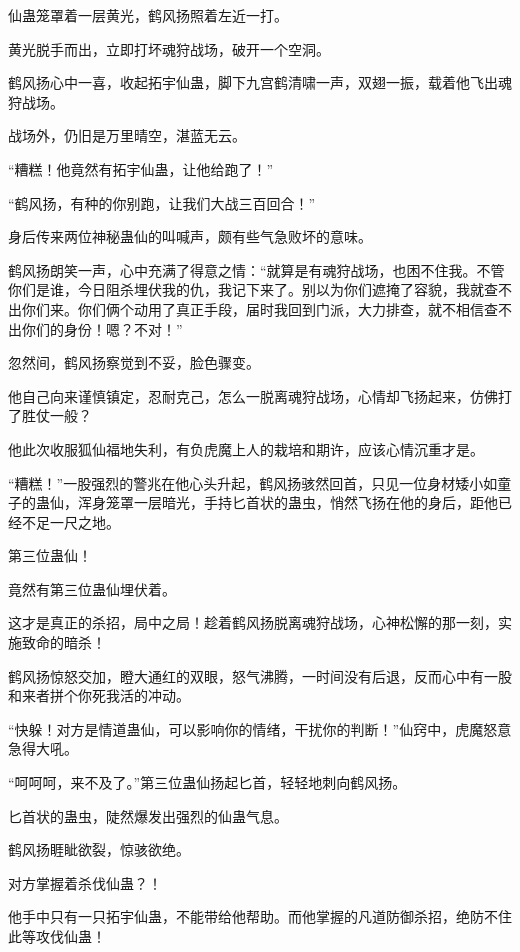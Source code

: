 \begin{this_body}
仙蛊笼罩着一层黄光，鹤风扬照着左近一打。

黄光脱手而出，立即打坏魂狩战场，破开一个空洞。

鹤风扬心中一喜，收起拓宇仙蛊，脚下九宫鹤清啸一声，双翅一振，载着他飞出魂狩战场。

战场外，仍旧是万里晴空，湛蓝无云。

“糟糕！他竟然有拓宇仙蛊，让他给跑了！”

“鹤风扬，有种的你别跑，让我们大战三百回合！”

身后传来两位神秘蛊仙的叫喊声，颇有些气急败坏的意味。

鹤风扬朗笑一声，心中充满了得意之情：“就算是有魂狩战场，也困不住我。不管你们是谁，今日阻杀埋伏我的仇，我记下来了。别以为你们遮掩了容貌，我就查不出你们来。你们俩个动用了真正手段，届时我回到门派，大力排查，就不相信查不出你们的身份！嗯？不对！”

忽然间，鹤风扬察觉到不妥，脸色骤变。

他自己向来谨慎镇定，忍耐克己，怎么一脱离魂狩战场，心情却飞扬起来，仿佛打了胜仗一般？

他此次收服狐仙福地失利，有负虎魔上人的栽培和期许，应该心情沉重才是。

“糟糕！”一股强烈的警兆在他心头升起，鹤风扬骇然回首，只见一位身材矮小如童子的蛊仙，浑身笼罩一层暗光，手持匕首状的蛊虫，悄然飞扬在他的身后，距他已经不足一尺之地。

第三位蛊仙！

竟然有第三位蛊仙埋伏着。

这才是真正的杀招，局中之局！趁着鹤风扬脱离魂狩战场，心神松懈的那一刻，实施致命的暗杀！

鹤风扬惊怒交加，瞪大通红的双眼，怒气沸腾，一时间没有后退，反而心中有一股和来者拼个你死我活的冲动。

“快躲！对方是情道蛊仙，可以影响你的情绪，干扰你的判断！”仙窍中，虎魔怒意急得大吼。

“呵呵呵，来不及了。”第三位蛊仙扬起匕首，轻轻地刺向鹤风扬。

匕首状的蛊虫，陡然爆发出强烈的仙蛊气息。

鹤风扬睚眦欲裂，惊骇欲绝。

对方掌握着杀伐仙蛊？！

他手中只有一只拓宇仙蛊，不能带给他帮助。而他掌握的凡道防御杀招，绝防不住此等攻伐仙蛊！

\end{this_body}

